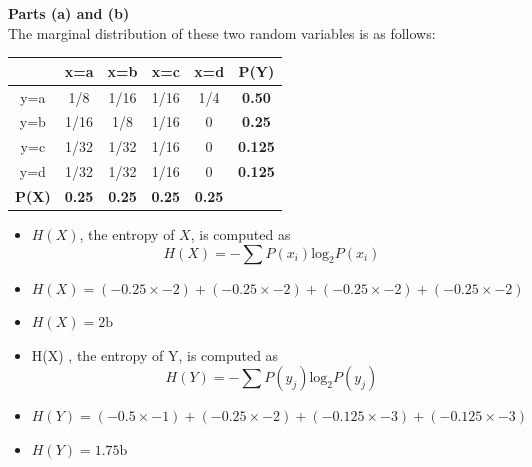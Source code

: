 \documentclass[a4paper,12pt]{article}
\begin{document}
\noindent \textbf{Parts (a) and (b)}\\
The marginal distribution of these two random variables is as follows:\\ \bigskip
{
\Large 
\begin{center}
\begin{tabular}{|c|c|c|c|c||c|}
\hline
&x=a& x=b & x=c & x=d &\textbf{P(Y)}\\ \hline
y=a &1/8 &1/16 &1/16 &1/4 & \textbf{0.50}\\ \hline
y=b &1/16 & 1/8& 1/16& 0 & \textbf{0.25}\\ \hline
y=c & 1/32&1/32 & 1/16 & 0& \textbf{0.125}\\ \hline
y=d & 1/32& 1/32& 1/16 & 0& \textbf{0.125}\\ \hline \hline
\textbf{P(X)} & \textbf{0.25}& \textbf{0.25}& \textbf{0.25} & \textbf{0.25}&\\ \hline
\end{tabular}
\end{center}
}
\medskip
\begin{itemize}
\item $H(X)$, the entropy of $X$, is computed as\\
 \[H(X) = -\sum P(x_i) \mbox{log}_2P(x_i)\] \item $H(X) =  (-0.25 \times -2) + (-0.25 \times -2) +(-0.25 \times -2) +(-0.25 \times -2)$\item $ H(X) = 2 \mbox{b}$ \bigskip

\item H(X) , the entropy of Y, is computed as\\
 \[H(Y) = -\sum P(y_j) \mbox{log}_2P(y_j)\] \item $H(Y) =  (-0.5 \times -1) +(-0.25 \times -2)  + (-0.125 \times -3)  +(-0.125 \times -3)$\item $ H(Y) = 1.75 \mbox{b}$



\end{itemize}

\newpage 
\end{document}
